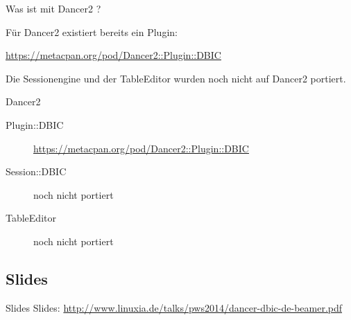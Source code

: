 Was ist mit Dancer2 ?

Für Dancer2 existiert bereits ein Plugin:

\url{https://metacpan.org/pod/Dancer2::Plugin::DBIC}

Die Sessionengine und der TableEditor wurden noch nicht auf Dancer2 portiert.

\begin{frame}{Dancer2}
  \begin{description}
  \item[Plugin::DBIC] \url{https://metacpan.org/pod/Dancer2::Plugin::DBIC}
  \item[Session::DBIC] noch nicht portiert
  \item[TableEditor] noch nicht portiert
  \end{description}
\end{frame}


\subsection{Slides}

\begin{frame}{Slides}
Slides:
\url{http://www.linuxia.de/talks/pws2014/dancer-dbic-de-beamer.pdf}
\end{frame}



